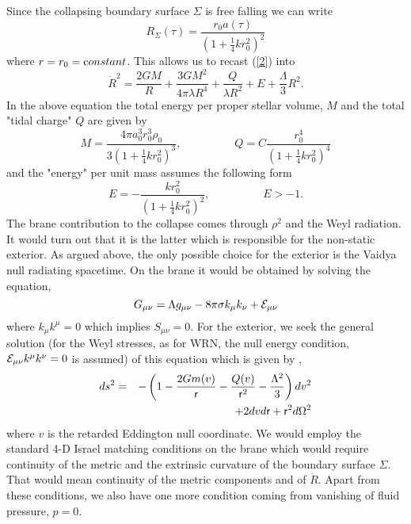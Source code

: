 \documentclass[a4paper,twocolumn,showpacs,preprintnumbers,amsmath,amssymb]{revtex4}
\begin{document}
Since the collapsing boundary surface $\Sigma$ is free falling we can write
\[R_{\Sigma}(\tau) = \frac{r_0a(\tau)}{(1 + \mbox{$\frac{1}{4}$}kr_0^2)^2}\]
where $r = r_0 = {\mbox constant}$. This allows  us to recast (\ref{2}) into  
\begin{equation} \label{222}
{\dot R}^2 = \frac{2GM}{R} + \frac{3GM^2}{4\pi \lambda R^4} + \frac{Q}{\lambda R^2} + E + \frac{\Lambda}{3}R^2 . \end{equation}
In the above equation the total energy per proper stellar volume, $M$ and the total "tidal charge" $Q$ are given by \cite{r}
\begin{equation}
M = \frac{4\pi a_0^3 r_0^3 \rho_0}{3(1 + \mbox{$\frac{1}{4}$}kr_0^2)^3}, \hspace{2cm} Q = C \frac{r_0^4}{(1 + \mbox{$\frac{1}{4}$}kr_0^2)^4}\end{equation}
and the "energy" per unit mass assumes the following form 
\begin{equation}
E = -\frac{kr_0^2}{(1 + \mbox{$\frac{1}{4}$}kr_0^2)^2}, \hspace{2cm} E > -1 .
\end{equation}
The brane contribution to the collapse comes through $\rho^2$ and the 
Weyl radiation. It would turn out that it is the latter which is 
responsible for the non-static exterior. As argued above, the only possible 
choice for the exterior is the Vaidya null radiating spacetime. On the 
brane it would be obtained by solving the equation,
\begin{equation}
G_{\mu\nu} = \Lambda g_{\mu\nu} -8\pi\sigma k_\mu k_\nu + {\cal E}_{\mu\nu}
\end{equation}
where $k_\mu k^\mu = 0$ which implies $S_{\mu\nu} = 0$. 
For the exterior, we seek the general solution (for the Weyl stresses, as for 
WRN, the null energy condition, ${\cal E}_{\mu\nu} k^\mu k^\nu = 0$ is 
assumed) of this equation which is given by \cite{n2},
\begin{eqnarray} \label{3}
ds^2 &=& - \left(1 - \frac{2Gm(v)}{\sf r} - \frac{Q(v)}{{\sf r}^2} - \frac{\Lambda {\sf }^2}{3}\right)dv^2 \nonumber \\
&&+ 2dvd{\sf r} + {\sf r}^2d\Omega^2\end{eqnarray}
where $v$ is the retarded Eddington null coordinate. We would employ the 
standard 4-D Israel matching conditions on the brane which 
would require continuity of the metric and the extrinsic curvature of the 
boundary surface $\Sigma$. That would mean continuity of the metric 
components and of $\dot R$. Apart from these conditions, we also have one more 
condition coming from vanishing of fluid pressure, $p=0$.
\end{document}
